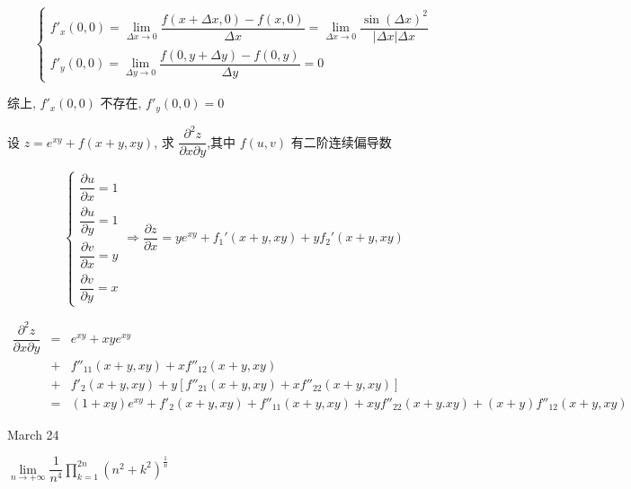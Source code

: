 \begin{solution}
	
	$$\begin{cases}
	  f'_{x}(0,0) = \lim\limits_{\Delta x \to 0} \dfrac{f(x+\Delta x,0)-f(x,0)}{\Delta x} = 
	  \lim\limits_{\Delta x \to 0} \dfrac{\sin (\Delta x)^2}{\big|\Delta x\big|\Delta x}\\
	  f'_{y}(0,0) = \lim\limits_{\Delta y \to 0} \dfrac{f(0,y+\Delta y)-f(0,y)}{\Delta y} = 0
	\end{cases}$$
	
	综上, $f'_{x}(0,0)$ 不存在, $f'_{y}(0,0)=0$
\end{solution}

\begin{example}[][Exam: 29.4.4]
	设 $z=e^{xy}+f(x+y,xy)$, 求 $\dfrac{\partial^2 z}{\partial x\partial y}$,其中 $f(u,v)$ 有二阶连续偏导数
\end{example}

\begin{solution}
	
	$$\begin{cases}
	  \dfrac{\partial u}{\partial x} = 1\\
	  \dfrac{\partial u}{\partial y} = 1\\
	  \dfrac{\partial v}{\partial x} = y\\
	  \dfrac{\partial v}{\partial y} = x
	\end{cases}\Rightarrow \dfrac{\partial z}{\partial x} = ye^{xy} + f_{1}'(x+y,xy) + yf_{2}'(x+y,xy)$$
	
	\begin{eqnarray*}
		\dfrac{\partial^{2} z}{\partial x\partial y} & = & e^{xy} + xye^{xy} \\
		& + & f''_{11}(x+y,xy) + xf''_{12}(x+y,xy)\\
		& + & f'_{2}(x+y,xy) + y\left[f''_{21}(x+y,xy) + xf''_{22}(x+y,xy)\right]\\
		& = & (1+xy)e^{xy} + f'_{2}(x+y,xy) + f''_{11}(x+y,xy) + xyf''_{22}(x+y.xy) + (x+y)f''_{12}(x+y,xy)
	\end{eqnarray*}
\end{solution}

\textcolor{purplea}{March 24}

\begin{example}[][Exam: 29.4.5]
	$\lim\limits_{n\rightarrow +\infty}\dfrac{1}{n^4}\prod\limits_{k=1}^{2n}(n^2+k^2)^{\frac{1}{n}}$
\end{example}

